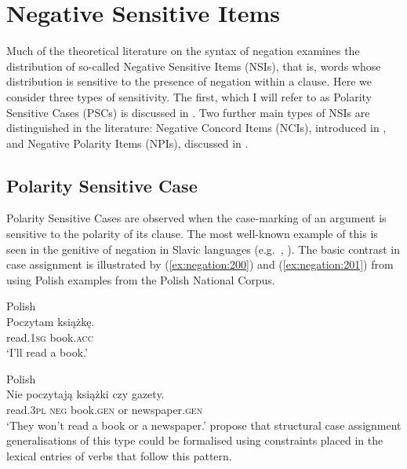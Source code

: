 \documentclass[output=paper,hidelinks]{langscibook}
\begin{document}
\section{Negative Sensitive Items}
\label{sec:negation:domains}

Much of the theoretical literature on the syntax of negation examines the distribution of so-called Negative Sensitive Items (NSIs), that is, words whose distribution is sensitive to the presence of negation within a clause. Here we consider three types of sensitivity. The first, which I will refer to as Polarity Sensitive Cases (PSCs) is discussed in . Two further main types of NSIs are distinguished in the literature: Negative Concord Items (NCIs),  introduced in , and Negative Polarity Items (NPIs), discussed in .

\subsection{Polarity Sensitive Case}
\label{sec:negation:case}

Polarity Sensitive Cases are observed when the case-marking of an argument is sensitive to the polarity of its clause. The most well-known example of this is seen in the genitive of negation in Slavic languages (e.g.\ \citealt{Neidle1988}, \citealt{Brown:99}). The basic contrast in case assignment is illustrated by (\ref{ex:negation:200}) and (\ref{ex:negation:201}) from \citet{PatejukPrzepiorkowski2014a} using Polish examples from the Polish National Corpus.

\ea\label{ex:negation:200} Polish \citep [431] {PatejukPrzepiorkowski2014a}\\
\gll Poczytam książkę.\\
read.\textsc{1sg} book.\textsc{acc}\\
\glt ‘I’ll read a book.’ 
\z

\ea
\label{ex:negation:201} Polish \citep [431] {PatejukPrzepiorkowski2014a}\\
\gll Nie poczytają książki czy gazety.\\
read.\textsc{3pl} \textsc{neg} book.\textsc{gen} or newspaper.\textsc{gen}\\
\glt‘They won’t read a book or a newspaper.’ 
\z
\citet{PatejukPrzepiorkowski2014a} propose that structural case assignment generalisations of this type could be formalised using constraints placed in the lexical entries of verbs that follow this pattern.
\end{document}
